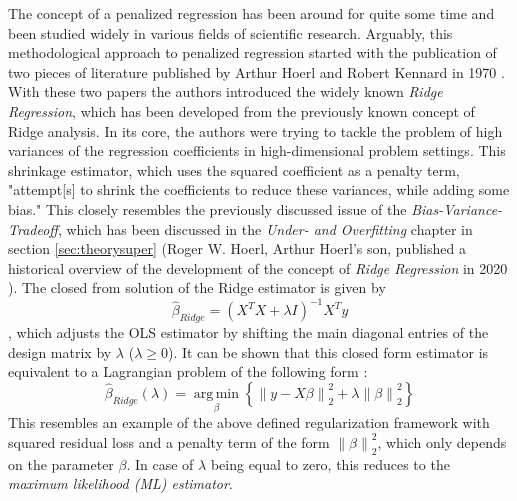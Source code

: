 \documentclass[12pt,a4paper]{article}
\newcommand{\norm}[1]{\left\lVert#1\right\rVert}
\DeclareMathOperator*{\argmin}{arg\,min}
\begin{document}
The concept of a penalized regression has been around for quite some time and been studied widely in various fields of scientific research. Arguably, this methodological approach to penalized regression started with the publication of two pieces of literature published by Arthur Hoerl and Robert Kennard in 1970 \parencite{HoerlKennard1970a, HoerlKennard1970b}. With these two papers the authors introduced the widely known \textit{Ridge Regression}, which has been developed from the previously known concept of Ridge analysis. In its core, the authors were trying to tackle the problem of high variances of the regression coefficients in high-dimensional problem settings. This shrinkage estimator, which uses the squared coefficient as a penalty term, "attempt[s] to shrink the coefficients to
reduce these variances, while adding some bias." \parencite{Hoerl2020} This closely resembles the previously discussed issue of the \textit{Bias-Variance-Tradeoff}, which has been discussed in the \textit{Under- and Overfitting} chapter in section \ref{sec:theorysuper} (Roger W. Hoerl, Arthur Hoerl's son, published a historical overview of the development of the concept of \textit{Ridge Regression} in 2020 \parencite{Hoerl2020}). The closed from solution of the Ridge estimator is given by
$$\hat{\beta}_{Ridge} = \left(X^TX+\lambda I\right)^{-1}X^Ty$$,
which adjusts the OLS estimator by shifting the main diagonal entries of the design matrix by $\lambda$ ($\lambda \geq 0$). It can be shown that this closed form estimator is equivalent to a Lagrangian problem of the following form \parencite{VanWieringen2015}:
$$\hat{\beta}_{Ridge}(\lambda) = \underset{\beta}{\argmin}\left\{\norm{y-X\beta}_2^2 + \lambda\norm{\beta}_2^2\right\}$$
This resembles an example of the above defined regularization framework with squared residual loss and a penalty term of the form $\norm{\beta}_2^2$, which only depends on the parameter $\beta$. In case of $\lambda$ being equal to zero, this reduces to the \textit{maximum likelihood (ML) estimator}. 
\end{document}
